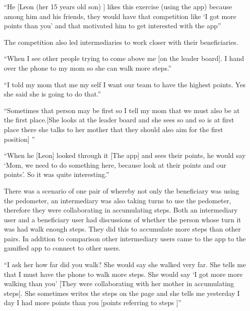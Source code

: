 \begin{enumerate}
 {``He [Leon (her 15 years old son) ] likes this exercise (using the app) because among him and his friends, they would have that competition like `I got more points than you' and that motivated him to get interested with the app''} 

The competition also led intermediaries to work closer with their beneficiaries.

 {``When I see other people trying to come above me [on the leader board]. I hand over the phone to my mom so she can walk more steps.''} 

 {``I told my mom that me my self I want our team to have the highest points. Yes she said she is going to do that.''} 

 {``Sometimes that person may be first so I tell my mom that we must also be at the first place.[She looks at the  leader board and she sees so and so is at first place there she talks to her mother that they should also aim for the first position] ''} 

 {``When he [Leon] looked through it [The app] and sees their points, he would say `Mom, we need to do something here, because look at their points and our points'. So it was quite interesting.''} 

There was a scenario of one pair of whereby not only the beneficiary was using the pedometer, an intermediary was also taking turns to use the pedometer, therefore they were collaborating in accumulating steps. Both an intermediary user and a beneficiary user had discussions of whether the person whose turn it was had walk enough steps. They did this to accumulate more steps than other pairs. In addition to comparison other intermediary users came to the app to the gamified app to connect to other users.

 {``I ask her how far did you walk?  She would say she walked very far. She tells me that I must have the phone to walk more steps. She would say `I got more more walking than you' [They were collaborating with her mother in accumulating steps]. She sometimes writes the steps on the page and she tells me yesterday I day I had more points than you [points referring to steps ]''} 


\end{enumerate}
